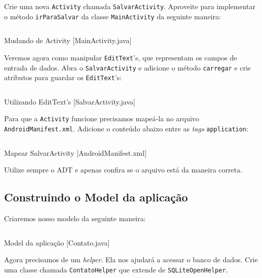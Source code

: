 Crie uma nova \texttt{Activity} chamada \texttt{SalvarActivity}. Aproveite para implementar o método
\texttt{irParaSalvar} da classe \texttt{MainActivity} da seguinte maneira:

\begin{listing}[H]
  \inputminted[linenos=true,frame=bottomline,tabsize=3]{ java }{ source/MainActivity-3.java }
  \caption{Mudando de Activity [MainActivity.java]}
\end{listing}

Veremos agora como manipular \texttt{EditText}'s, que representam os campos de entrada de dados. Abra o
\texttt{SalvarActivity} e adicione o método \texttt{carregar} e crie atributos para guardar os \texttt{EditText}'s:

\begin{listing}[H]
  \inputminted[linenos=true,frame=bottomline,tabsize=3]{ java }{ source/SalvarActivity-1.java }
  \caption{Utilizando EditText's [SalvarActivity.java]}
\end{listing}

Para que a \texttt{Activity} funcione precisamos mapeá-la no arquivo \texttt{AndroidManifest.xml}. Adicione o
conteúdo abaixo entre as \textit{tags} \texttt{application}:

\begin{listing}[H]
  \inputminted[linenos=true,frame=bottomline,tabsize=3]{ xml }{ source/AndroidManifest-2.xml }
  \caption{Mapear SalvarActivity [AndroidManifest.xml]}
\end{listing}

Utilize sempre o ADT e apenas confira se o arquivo está da maneira correta.

\subsection{Construindo o Model da aplicação}

Criaremos nosso modelo da seguinte maneira:

\begin{listing}[H]
  \inputminted[linenos=true,frame=bottomline,tabsize=3]{ java }{ source/Contato-1.java }
  \caption{Model da aplicação [Contato.java]}
\end{listing}

Agora precisamos de um \textit{helper}. Ela nos ajudará a acessar o banco de dados. Crie uma classe
chamada \texttt{ContatoHelper} que extende de \texttt{SQLiteOpenHelper}.

